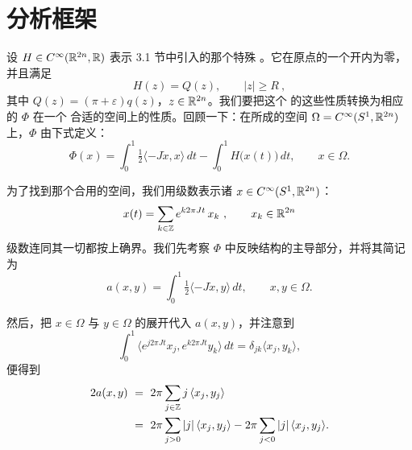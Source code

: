 
\section{分析框架}
\label{sec:analytical-setting}
%
%
%

设 $H\in C^{\infty}(\mathbb{R}^{2n},\mathbb{R})$ 表示 3.1 节中引入的那个特殊%
\trHamiltonianFunction。它在原点的一个开\trNeighborhood{}内为零，并且满足
\begin{equation}\label{eq:hz-quadratic-growth}
H(z)=Q(z),\qquad |z|\geq R\ ,
\end{equation}
其中\trQuadraticForm{} $Q(z)=(\pi+\varepsilon)q(z)$，$z\in\mathbb{R}^{2n}$。我们要把这个%
\trHamiltonianFunction{}的这些性质转换为相应的\trFunctional{} $\Phi$ 在一个%
合适的\trHilbert{}空间上的性质。回顾一下：在\trSmooth{}\trLoop{}所成的空间%
$\Omega=C^{\infty}(S^{1},\mathbb{R}^{2n})$ 上，$\Phi$ 由下式定义：
\begin{equation}\label{eq:phi-loop-space}
\Phi(x)=\int_{0}^{1}\tfrac{1}{2}\langle-J\dot{x},x\rangle\,dt-%
\int_{0}^{1}H\bigl(x(t)\bigr)\,dt,\qquad x\in\Omega.
\end{equation}

为了找到那个合用的\trHilbert{}空间，我们用\trFourier{}级数表示诸\trPeriodic{}%
\trLoop{} $x\in C^{\infty}(S^{1},\mathbb{R}^{2n})$：
\begin{equation}\label{eq:fourier-series-loop}
x(t)=\sum_{k\in\mathbb{Z}}e^{k2\pi Jt}\,x_{k}\ ,\qquad x_{k}\in\mathbb{R}^{2n}
\end{equation}
级数连同其一切\trDerivative{}都按上确界\trNorm{}\trConverge。我们先考察 $\Phi$%
中反映\trSymplectic{}结构的主导部分，并将其简记为
\begin{equation}\label{eq:a-omega}
a(x,y)=\int_{0}^{1}\tfrac{1}{2}\langle-J\dot{x},y\rangle\,dt,\qquad x,y\in\Omega.
\end{equation}

然后，把 $x\in\Omega$ 与 $y\in\Omega$ 的\trFourier{}展开代入 $a(x,y)$，并注意到
\[
\int_{0}^{1}\bigl\langle e^{j2\pi Jt}x_{j},e^{k2\pi Jt}y_{k}\bigr\rangle%
\,dt=\delta_{jk}\langle x_{j},y_{k}\rangle,
\]
便得到
\begin{equation}\label{eq:a-fourier-decomposition}
\begin{aligned}
2a(x,y)\ &=\ 2\pi\sum_{j\in\Z}j\,\langle x_{j},y_{j}\rangle\\
&=\ 2\pi\sum_{j>0}|j|\,\langle x_{j},y_{j}\rangle-%
2\pi\sum_{j<0}|j|\,\langle x_{j},y_{j}\rangle.
\end{aligned}
\end{equation}

